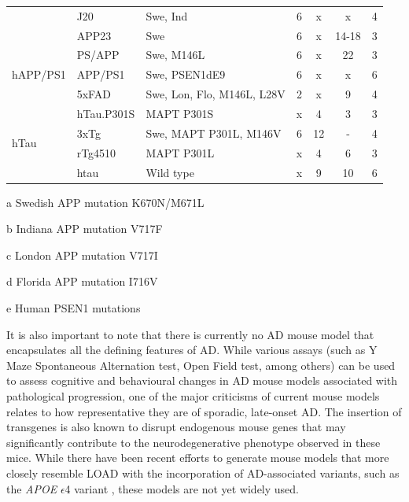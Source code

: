 \begin{table}[h]
\begin{threeparttable}
\begin{tabular}{@{}lllcccc@{}}
			& J20                   & Swe\tnote{a}, Ind\tnote{b} & 6  & x  & x     & 4                \\
			& APP23                 & Swe\tnote{a}               & 6  & x  & 14-18 & 3                \\
			\multirow{3}{*}{hAPP/PS1} & PS/APP & Swe\tnote{a}, M146L\tnote{e}                 & 6  & x  & 22    & 3                \\
			& APP/PS1         & Swe\tnote{a}, PSEN1dE9              & 6  & x  & x     & 6                \\
			& 5xFAD                 & Swe\tnote{a}, Lon\tnote{a}, Flo\tnote{c}, M146L\tnote{e}, L28V\tnote{e} & 2  & x  & 9     & 4                \\
			\multirow{4}{*}{hTau}     & hTau.P301S            & MAPT P301S                 & x  & 4  & 3     & 3                \\
			& 3xTg                  & Swe\tnote{a}, MAPT P301L, M146V     & 6  & 12 & -    & 4                \\
			& rTg4510               & MAPT P301L                 & x  & 4  & 6     & 3                \\
			& htau                  & Wild type                   & x  & 9  & 10    & 6                \\ \cmidrule(l){1-7} 
		\end{tabular}
		\begin{tablenotes}
			\footnotesize
			\item[a] Swedish APP mutation K670N/M671L
			\item[b] Indiana APP mutation V717F
			\item[c] London APP mutation V717I
			\item[d] Florida APP mutation I716V 
			\item[e] Human PSEN1 mutations 
		\end{tablenotes}
	\end{threeparttable}
\end{table}

It is also important to note that there is currently no AD mouse model that encapsulates all the defining features of AD. While various assays (such as Y Maze Spontaneous Alternation test, Open Field test, among others) can be used to assess cognitive and behavioural changes in AD mouse models associated with pathological progression\cite{Blackmore2017}, one of the major criticisms of current mouse models relates to how representative they are of sporadic, late-onset AD. The insertion of transgenes is also known to disrupt endogenous mouse genes that may significantly contribute to the neurodegenerative phenotype observed in these mice\cite{Gamache2019}. While there have been recent efforts to generate mouse models that more closely resemble LOAD with the incorporation of AD-associated variants, such as the \textit{APOE} $\epsilon$4 variant \cite{apoe4trem2_mousemodel,Lewandowski2020}, these models are not yet widely used. 

